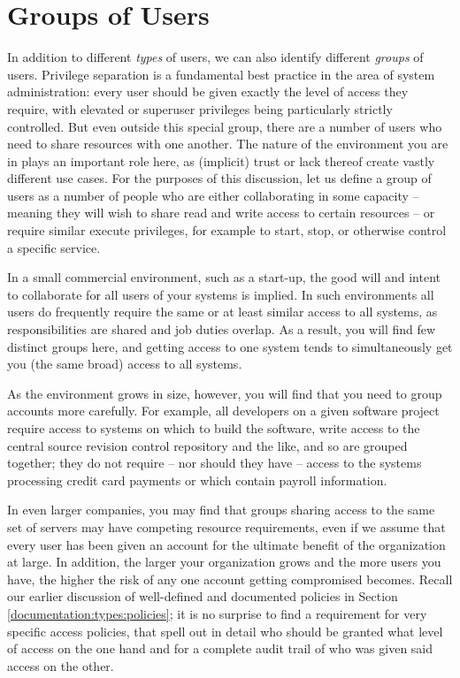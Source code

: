 \section{Groups of Users}
\label{multi-user:groups}

In addition to different {\em types} of users, we can
also identify different {\em groups} of users.
Privilege separation is a fundamental best practice in
the area of system administration: every user should
be given exactly the level of access they require,
with elevated or superuser privileges being
particularly strictly controlled.  But even outside
this special group, there are a number of users who
need to share resources with one another.  The nature
of the environment you are in plays an important role
here, as (implicit) trust or lack thereof create
vastly different use cases.  For the purposes of this
discussion, let us define a group of users as a number
of people who are either collaborating in some
capacity -- meaning they will wish to share read and
write access to certain resources -- or require
similar execute privileges, for example to start,
stop, or otherwise control a specific service.

In a small commercial environment, such as a start-up,
the good will and intent to collaborate for all users
of your systems is implied.  In such environments all
users do frequently require the same or at least
similar access to all systems, as responsibilities are
shared and job duties overlap.  As a result, you will
find few distinct groups here, and getting access to
one system tends to simultaneously get you (the same
broad) access to all systems.

As the environment grows in size, however, you will
find that you need to group accounts more carefully.
For example, all developers on a given software
project require access to systems on which to build
the software, write access to the central source
revision control repository and the like, and so are
grouped together; they do not require -- nor should
they have -- access to the systems processing credit
card payments or which contain payroll information.

In even larger companies, you may find that groups
sharing access to the same set of servers may have
competing resource requirements, even if we assume
that every user has been given an account for the
ultimate benefit of the organization at large. In
addition, the larger your organization grows and the
more users you have, the higher the risk of any one
account getting compromised becomes.  Recall our
earlier discussion of well-defined and documented
policies in Section
\ref{documentation:types:policies}; it is no surprise
to find a requirement for very specific access
policies, that spell out in detail who should be
granted what level of access on the one hand and for a
complete audit trail of who was given said access on
the other. \\

